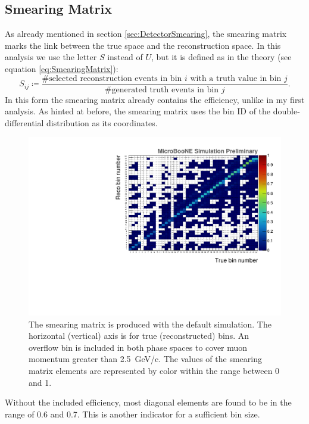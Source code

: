 \subsection{Smearing Matrix} \label{sec:NewDetectorSmearing}
As already mentioned in section \ref{sec:DetectorSmearing}, the smearing matrix marks the link between the true space and the reconstruction space. In this analysis we use the letter $S$ instead of $U$, but it is defined as in the theory (see equation \ref{eq:SmearingMatrix}):
\begin{equation}
    S_{ij} \coloneqq \frac{\text{\# selected reconstruction events in bin }i \text{ with a truth value in bin }j}{\text{\# generated truth events in bin }j}.
\end{equation}
In this form the smearing matrix already contains the efficiency, unlike in my first analysis. As hinted at before, the smearing matrix uses the bin ID of the double-differential distribution as its coordinates.
\begin{figure}[htbp]
  \centering
  \includegraphics[width=\textwidth]{images/NewCCInclusive/xsec/Smearing_matrix_tunedGENIEv3.pdf}
  \caption[Bin ID Smearing Matrix]{The smearing matrix is produced with the default simulation. The horizontal (vertical) axis is for true (reconstructed) bins. An overflow bin is included in both phase spaces to cover muon momentum greater than \SI{2.5}{\GeV/c}. The values of the smearing matrix elements are represented by color within the range between 0 and 1.}
  \label{fig:Smearing_matrix_tunedGENIEv3}
\end{figure}
Without the included efficiency, most diagonal elements are found to be in the range of 0.6 and 0.7. This is another indicator for a sufficient bin size. 

